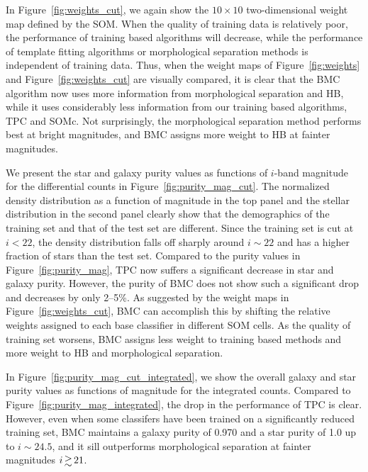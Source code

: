 \documentclass[useAMS,usenatbib]{mn2e}
\begin{document}
In Figure~\ref{fig:weights_cut}, we again show the $10\times10$
two-dimensional weight map defined by the SOM.
When the quality of training data is relatively poor,
the performance of training based algorithms will decrease,
while the performance of template fitting algorithms
or morphological separation methods
is independent of training data.
Thus, when the weight maps of Figure~\ref{fig:weights}
and Figure~\ref{fig:weights_cut} are visually compared,
it is clear that
the BMC algorithm now uses more information from
morphological separation and HB,
while it uses considerably less information from 
our training based algorithms, TPC and SOMc.
Not surprisingly, the morphological separation method
performs best at bright magnitudes,
and BMC assigns more weight to HB at fainter magnitudes.

We present the star and galaxy purity values as functions of
$i$-band magnitude for the differential counts
in Figure~\ref{fig:purity_mag_cut}.
The normalized density distribution as a function of magnitude
in the top panel
and the stellar distribution in the second panel
clearly show that the demographics of the training set and 
that of the test set are different.
Since the training set is cut at $i < 22$,
the density distribution falls off sharply around $i \sim 22$
and has a higher fraction of stars than the test set.
Compared to the purity values in Figure~\ref{fig:purity_mag},
TPC now suffers a significant decrease in star and galaxy purity.
However, the purity of BMC does not show such a significant drop
and decreases by only 2--5\%.
As suggested by the weight maps in Figure~\ref{fig:weights_cut},
BMC can accomplish this by shifting the relative weights assigned to
each base classifier in different SOM cells.
As the quality of training set worsens,
BMC assigns less weight to training based methods
and more weight to HB and morphological separation.

In Figure~\ref{fig:purity_mag_cut_integrated}, we show
the overall galaxy and star purity values as functions of magnitude
for the integrated counts.
Compared to Figure~\ref{fig:purity_mag_integrated},
the drop in the performance of TPC is clear.
However, even when some classifers have been trained on
a significantly reduced training set,
BMC maintains a galaxy purity of 0.970 and a star purity of 1.0
up to $i \sim 24.5$, and it sill outperforms morphological separation
at fainter magnitudes $i \ga 21$.
\end{document}
